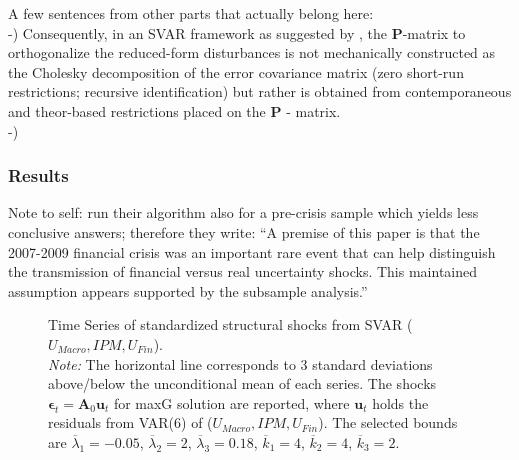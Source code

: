 \documentclass[a4paper,11pt,listof=nochaptergap,oneside,pointednumbers,bibtotoc,bigheadings,liststotoc]{scrbook}
\theoremstyle{mysatz}
\theoremstyle{mydefinition}
\theoremstyle{mybemerkung}
\renewcommand*{\paragraph}[1]{\subsubsection*{#1} \vspace{-3mm}} %
\newcommand{\vect}[1]{\boldsymbol{\mathbf{#1}}}
\begin{document}
A few sentences from other parts that actually belong here:\\
-) Consequently, in an SVAR framework as suggested by \citet{ludvigsonetal:18}, the $\vect{P}$-matrix to orthogonalize the reduced-form disturbances is not mechanically constructed as the Cholesky decomposition of the error covariance matrix (zero short-run restrictions; recursive identification) but rather is obtained from contemporaneous and theor-based restrictions placed on the $\vect{P}$ - matrix.\\
-) 

\paragraph{Results}
Note to self: \citet[p. 25]{ludvigsonetal:18} run their algorithm also for a pre-crisis sample which yields less conclusive answers; therefore they write: ``A premise of this paper is that the 2007-2009 financial crisis was an important rare event that can help distinguish the transmission of financial versus real uncertainty shocks. This maintained assumption appears supported by the subsample analysis.''


\begin{figure}[!h]
   \centering
   \setlength\fboxsep{0pt}
   \setlength\fboxrule{0pt}
      \caption[Time Series of standardized structural shocks from SVAR ($U_{Macro}, IPM, U_{Fin}$).]{Time Series of standardized structural shocks from SVAR ($U_{Macro}, IPM, U_{Fin}$).\\
      \textit{Note:}  The horizontal line corresponds to 3 standard deviations above/below the unconditional mean of each series. The shocks $\vect{\epsilon}_t = \vect{A}_0\vect{u}_t$ for maxG solution are reported, where $\vect{u}_t$ holds the residuals from VAR(6) of ($U_{Macro}, IPM, U_{Fin}$). The selected bounds are $\overline{\lambda}_1 = -0.05$, $\overline{\lambda}_2 = 2$, $\overline{\lambda}_3 = 0.18$, $\overline{k}_1 = 4$, $\overline{k}_2 = 4$, $\overline{k}_3 = 2$.}   \label{fig:ludvigsonetal_timeseries_e_shocks}
\end{figure}
\end{document}

